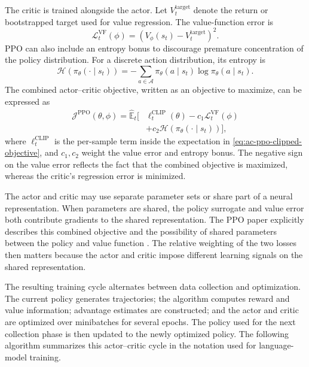 The critic is trained alongside the actor. Let
\(V_t^{\mathrm{target}}\) denote the return or bootstrapped target used for
value regression. The value-function error is
\begin{equation}
    \mathcal{L}^{\mathrm{VF}}_t(\phi)
    =
    \left(
        V_\phi(s_t)-V_t^{\mathrm{target}}
    \right)^2.
    \label{eq:ac-ppo-value-loss}
\end{equation}
PPO can also include an entropy bonus to discourage premature concentration
of the policy distribution. For a discrete action distribution, its
entropy is
\begin{equation}
    \mathcal{H}(\pi_\theta(\cdot\mid s_t))
    =
    -\sum_{a\in\mathcal{A}}
    \pi_\theta(a\mid s_t)
    \log\pi_\theta(a\mid s_t).
    \label{eq:ac-policy-entropy}
\end{equation}
The combined actor--critic objective, written as an objective to maximize,
can be expressed as
\begin{align}
    \mathcal{J}^{\mathrm{PPO}}(\theta,\phi)
    =
    \widehat{\mathbb{E}}_t
    \Big[
        &\ell^{\mathrm{CLIP}}_t(\theta)
        -c_1\mathcal{L}^{\mathrm{VF}}_t(\phi)
        \nonumber\\
        &+c_2\mathcal{H}(\pi_\theta(\cdot\mid s_t))
    \Big],
    \label{eq:ac-ppo-joint-objective}
\end{align}
where \(\ell^{\mathrm{CLIP}}_t\) is the per-sample term inside the
expectation in \cref{eq:ac-ppo-clipped-objective}, and \(c_1,c_2\) weight
the value error and entropy bonus. The negative sign on the value error
reflects the fact that the combined objective is maximized, whereas the
critic's regression error is minimized.

The actor and critic may use separate parameter sets or share part of a
neural representation. When parameters are shared, the policy surrogate
and value error both contribute gradients to the shared representation.
The PPO paper explicitly describes this combined objective and the
possibility of shared parameters between the policy and value function
\parencite{schulman2017ppo}. The relative weighting of the two losses then
matters because the actor and critic impose different learning signals on
the shared representation.

The resulting training cycle alternates between data collection and
optimization. The current policy generates trajectories; the algorithm
computes reward and value information; advantage estimates are constructed;
and the actor and critic are optimized over minibatches for several epochs.
The policy used for the next collection phase is then updated to the newly
optimized policy. The following algorithm summarizes this actor--critic
cycle in the notation used for language-model training.


